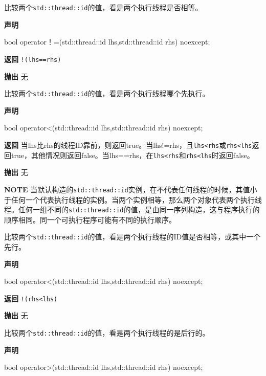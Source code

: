 
比较两个\texttt{std::thread::id}的值，看是两个执行线程是否相等。

\textbf{声明}

\begin{cpp}
bool operator！=(std::thread::id lhs,std::thread::id rhs) noexcept;
\end{cpp}

\textbf{返回}
\texttt{!(lhs==rhs)}

\textbf{抛出}
无


比较两个\texttt{std::thread::id}的值，看是两个执行线程哪个先执行。

\textbf{声明}

\begin{cpp}
bool operator<(std::thread::id lhs,std::thread::id rhs) noexcept;
\end{cpp}

\textbf{返回}
当lhs比rhs的线程ID靠前，则返回true。当lhs!=rhs，且\texttt{lhs<rhs}或\texttt{rhs<lhs}返回true，其他情况则返回false。当lhs==rhs，在\texttt{lhs<rhs}和\texttt{rhs<lhs}时返回false。

\textbf{抛出}
无

\textbf{NOTE} 当默认构造的\texttt{std::thread::id}实例，在不代表任何线程的时候，其值小于任何一个代表执行线程的实例。当两个实例相等，那么两个对象代表两个执行线程。任何一组不同的\texttt{std::thread::id}的值，是由同一序列构造，这与程序执行的顺序相同。同一个可执行程序可能有不同的执行顺序。


比较两个\texttt{std::thread::id}的值，看是两个执行线程的ID值是否相等，或其中一个先行。

\textbf{声明}

\begin{cpp}
bool operator<(std::thread::id lhs,std::thread::id rhs) noexcept;
\end{cpp}

\textbf{返回}
\texttt{!(rhs<lhs)}

\textbf{抛出}
无


比较两个\texttt{std::thread::id}的值，看是两个执行线程的是后行的。

\textbf{声明}

\begin{cpp}
bool operator>(std::thread::id lhs,std::thread::id rhs) noexcept;
\end{cpp}

